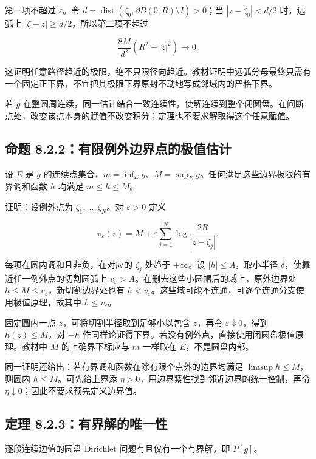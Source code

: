 \documentclass[11pt,a4paper]{article}
\begin{document}
第一项不超过 \(\varepsilon\)。令
\(d=\operatorname{dist}(\zeta_0,\partial B(0,R)\setminus I)>0\)；当
\(|z-\zeta_0|<d/2\) 时，远弧上 \(|\zeta-z|\ge d/2\)，所以第二项不超过

\[
\frac{8M}{d^2}(R^2-|z|^2)\longrightarrow0.\tag{8.2.B}
\]

这证明任意路径趋近的极限，绝不只限径向趋近。教材证明中远弧分母最终只需有一个固定正下界，不宜把其极限下界原封不动地写成邻域内的严格下界。

若 \(g\)
在整圆周连续，同一估计结合一致连续性，使解连续到整个闭圆盘。在间断点处，改变该点本身的赋值不改变积分；定理也不要求解取得这个任意赋值。

\subsection{命题 8.2.2：有限例外边界点的极值估计}\label{ch08-s2-heading-3}

设 \(E\) 是 \(g\)
的连续点集合，\(m=\inf_Eg\)、\(M=\sup_Eg\)。任何满足这些边界极限的有界调和函数
\(h\) 均满足 \(m\le h\le M\)。

证明：设例外点为 \(\zeta_1,\ldots,\zeta_N\)。对 \(\varepsilon>0\) 定义

\[
v_\varepsilon(z)=M+\varepsilon\sum_{j=1}^N\log\frac{2R}{|z-\zeta_j|}.\tag{8.2.C}
\]

每项在圆内调和且非负，在对应的 \(\zeta_j\) 处趋于 \(+\infty\)。设
\(|h|\le A\)，取小半径 \(\delta\)，使靠近任一例外点的切割圆弧上
\(v_\varepsilon>A\)。在删去这些小圆帽后的域上，原外边界处
\(h\le M\le v_\varepsilon\)，新切割边界处也有
\(h<v_\varepsilon\)。这些域可能不连通，可逐个连通分支使用极值原理，故其中
\(h\le v_\varepsilon\)。

固定圆内一点 \(z\)，可将切割半径取到足够小以包含 \(z\)，再令
\(\varepsilon\downarrow0\)，得到 \(h(z)\le M\)。对 \(-h\)
作同样论证得下界。若没有例外点，直接使用闭圆盘极值原理。教材中 \(M\)
的上确界下标应与 \(m\) 一样取在 \(E\)，不是圆盘内部。

同一证明还给出：若有界调和函数在除有限个点外的边界均满足
\(\limsup h\le M\)，则圆内 \(h\le M\)。可先给上界添
\(\eta>0\)，用边界紧性找到邻近边界的统一控制，再令
\(\eta\downarrow0\)；因此不要求预先定义边界值。

\subsection{定理 8.2.3：有界解的唯一性}\label{ch08-s2-heading-4}

逐段连续边值的圆盘 Dirichlet 问题有且仅有一个有界解，即 \(P[g]\)。
\end{document}
